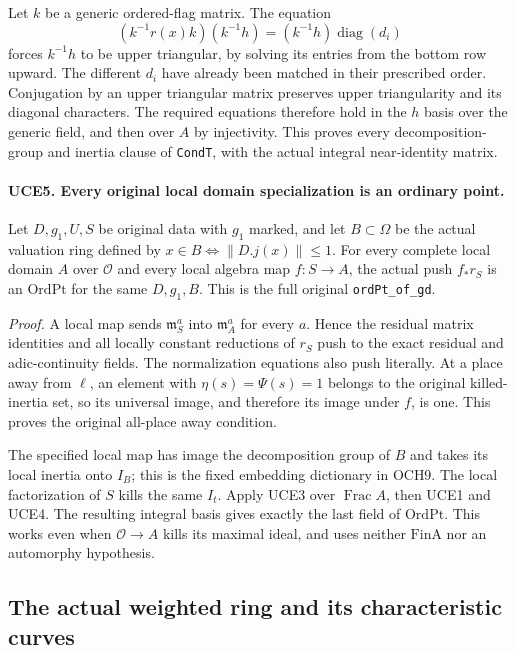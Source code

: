 \documentclass[11pt,a4paper]{article}
\numberwithin{equation}{section}
\theoremstyle{remark}\newtheorem{remark}[theorem]{Remark}
\begin{document}
Let \(k\) be a generic ordered-flag matrix.  The equation
\[
       (k^{-1}r(x)k)(k^{-1}h)=(k^{-1}h)\operatorname{diag}(d_i)
\]
forces \(k^{-1}h\) to be upper triangular, by solving its entries
from the bottom row upward.  The different \(d_i\) have already
been matched in their prescribed order.  Conjugation by an upper
triangular matrix preserves upper triangularity and its diagonal
characters.  The required equations therefore hold in the \(h\)
basis over the generic field, and then over \(A\) by injectivity.
This proves every decomposition-group and inertia clause of
\texttt{Cond\allowbreak T}, with the actual integral near-identity matrix.

\paragraph{UCE5. Every original local domain specialization is an ordinary point.}
\label{claim:UCE5}
Let \(D,g_1,U,S\) be original data with \(g_1\) marked, and let
\(B\subset\Omega\) be the actual valuation ring defined by
\(x\in B\Longleftrightarrow\|D.j(x)\|\le1\).
For every complete local domain \(A\) over \(\mathcal O\) and
every local algebra map \(f:S\to A\), the actual push
\(f_*r_S\) is an \(\mathrm{OrdPt}\) for the same
\(D,g_1,B\).  This is the full original \texttt{ord\allowbreak Pt\_\allowbreak of\_\allowbreak gd}.

\emph{Proof.}
A local map sends \(\mathfrak m_S^a\) into
\(\mathfrak m_A^a\) for every \(a\).  Hence the residual matrix
identities and all locally constant reductions of \(r_S\) push
to the exact residual and adic-continuity fields.  The normalization
equations also push literally.
At a place away from \(\ell\), an element with
\(\eta(s)=\Psi(s)=1\) belongs to the original killed-inertia
set, so its universal image, and therefore its image under \(f\),
is one.  This proves the original all-place away condition.

The specified local map has image the decomposition group of \(B\)
and takes its local inertia onto \(I_B\); this is the fixed
embedding dictionary in OCH9.  The local factorization of \(S\)
kills the same \(I_t\).  Apply UCE3 over \(\operatorname{Frac}A\),
then UCE1 and UCE4.  The resulting integral basis gives exactly
the last field of \(\mathrm{OrdPt}\).  This works even when
\(\mathcal O\to A\) kills its maximal ideal, and uses neither
\(\mathrm{FinA}\) nor an automorphy hypothesis.

\subsection{The actual weighted ring and its characteristic curves}
\end{document}
